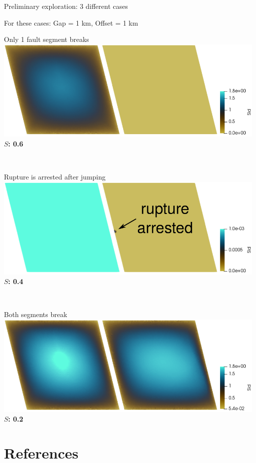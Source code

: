 \documentclass{beamer}
\newcommand\dirbiblio{../../biblio/}
\begin{document}
\begin{frame}
 {Preliminary exploration: 3 different cases}

 \begin{center}
 For these cases: Gap = 1 km, Offset = 1 km \\
 \vskip 0.4cm
 \begin{minipage}{0.48\linewidth}
 \centering \small Only 1 fault segment breaks \\
  	\includegraphics[width=\textwidth]{images/nojump/nojump_neg_0004.png}   
    {\bf $S$: 0.6}
 \end{minipage} \,
 \begin{minipage}{0.48\linewidth}
    \centering \small Rupture is arrested after jumping \\
  	\includegraphics[width=\textwidth]{images/arrested/arrested_neg_0010.png}   
  	{\bf $S$: 0.4}
 \end{minipage} \\
 \vskip 0.5cm
 \begin{minipage}{0.45\linewidth}
    \centering \small Both segments break \\
  	\includegraphics[width=\textwidth]{images/jumping/jumping_neg_0004.png}   
  	{\bf $S$: 0.2}
 \end{minipage}
 \end{center}
 \addtocounter{framenumber}{-1}
  
\end{frame}



\section*{References}
\begin{frame}

    {\tiny  }							    

\end{frame}
\end{document}
